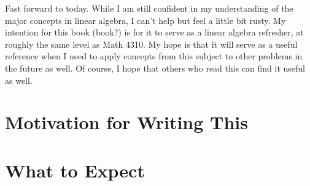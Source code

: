 \documentclass[paper=a4, fontsize=11pt,twoside]{scrartcl}   %
\begin{document}
Fast forward to today. While I am still confident in my understanding of the major concepts in linear algebra, I can't help but feel a little bit rusty. My intention for this book (book?)
is for it to serve as a linear algebra refresher, at roughly the same level as Math 4310. My hope is that it will serve as a useful reference when I need to apply concepts from this subject to other problems in the future as well. Of course, I hope that others who read this can find it useful as well.

\section{Motivation for Writing This}

\section{What to Expect}
\end{document}

